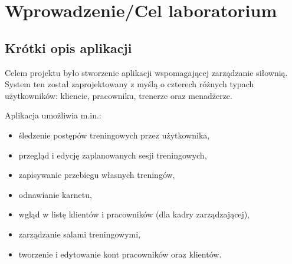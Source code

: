 \documentclass[../../spr.tex]{subfiles}
\begin{document}
\section{Wprowadzenie/Cel laboratorium}

\subsection{Krótki opis aplikacji}
Celem projektu było stworzenie aplikacji wspomagającej zarządzanie siłownią. System ten został zaprojektowany z myślą o czterech różnych typach użytkowników: kliencie, pracowniku, trenerze oraz menadżerze. 

Aplikacja umożliwia m.in.:
\begin{itemize}
    \item śledzenie postępów treningowych przez użytkownika,
    \item przegląd i edycję zaplanowanych sesji treningowych,
    \item zapisywanie przebiegu własnych treningów,
    \item odnawianie karnetu,
    \item wgląd w listę klientów i pracowników (dla kadry zarządzającej),
    \item zarządzanie salami treningowymi,
    \item tworzenie i edytowanie kont pracowników oraz klientów.
\end{itemize}
\end{document}
